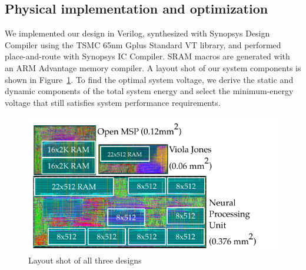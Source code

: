\begin{table}[h]
  \caption{Full face authentication system parameters.}
  \label{table:fa-hardware}
  \centering

\end{table}

\subsection{Physical implementation and optimization}

We implemented our design in Verilog, synthesized with Synopsys Design Compiler using the TSMC 65nm Gplus Standard VT library, and performed place-and-route with Synopsys IC Compiler. SRAM macros are generated with an ARM Advantage memory compiler. A layout shot of our system components is shown in Figure~\ref{fig:layout_shot}. To find the optimal system voltage, we derive the static and dynamic components of the total system energy and select the minimum-energy voltage that still satisfies system performance requirements.

\begin{figure}
\centering
      \includegraphics[width=.8\textwidth]{nsp-figs/layout.pdf}
    \caption{Layout shot of all three designs}
    \label{fig:layout_shot}
\end{figure}


